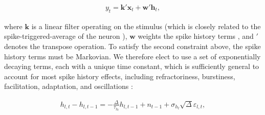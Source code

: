 \documentclass[10pt]{article}
\providecommand{\ve}[1]{\boldsymbol{#1}}
\providecommand{\ve}[1]{\boldsymbol{#1}}
\begin{document}
\begin{align} \label{eq:y_t}
y_t = \ve{k}' \ve{x}_t + \ve{w}' \ve{h}_t,
\end{align}

\noindent where $\ve{k}$ is a linear filter operating on the stimulus (which is closely related to the spike-triggered-average of the neuron \cite{Paninski04c}), $\ve{w}$ weights the spike history terms \cite{TruccoloBrown05}, and $'$ denotes the transpose operation. To satisfy the second constraint above, the spike history terms must be Markovian.  We therefore elect to use a set of exponentially decaying terms, each with a unique time constant, which is sufficiently general to account for most spike history effects, including refractoriness, burstiness, facilitation, adaptation, and oscillations \cite{Paninski04}:  

\begin{align} \label{eq:h_t}
h_{l,t} - h_{l,t-1} = - \frac{\Delta}{\tau_{h_l}}h_{l,t-1} + n_{t-1} + \sigma_{h_l} \sqrt{\Delta} \varepsilon_{l,t},
\end{align}


%
%
%
%
\end{document}
